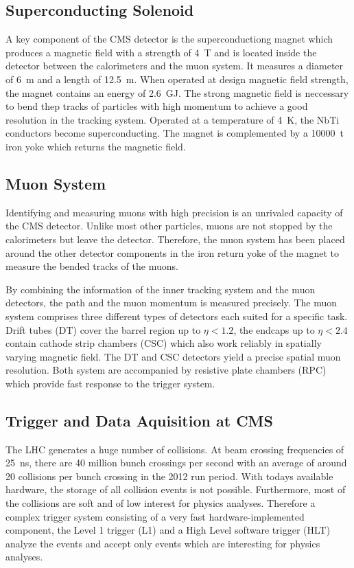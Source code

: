 \subsection{Superconducting Solenoid}

A key component of the CMS detector is the superconductiong magnet which
produces a magnetic field with a strength of \SI{4}{\tesla} and is located
inside the detector between the calorimeters and the muon system. It measures a
diameter of \SI{6}{\meter} and a length of \SI{12.5}{\meter}. When operated at
design magnetic field strength, the magnet contains an energy of
\SI{2.6}{\giga\joule}. The strong magnetic field is neccessary to bend thep
tracks of particles with high momentum to achieve a good resolution in the
tracking system. Operated at a temperature of \SI{4}{\kelvin}, the NbTi conductors become
superconducting. The magnet is complemented by a \SI{10000}{\tonne} iron yoke
which returns the magnetic field.

\subsection{Muon System}

Identifying and measuring muons with high precision is an unrivaled capacity of
the CMS detector. Unlike most other particles, muons are not stopped by the
calorimeters but leave the detector. Therefore, the muon system has been placed
around the other detector components in the iron return yoke of the magnet to
measure the bended tracks of the muons.

By combining the information of the inner tracking system and the muon
detectors, the path and the muon momentum is measured precisely. The muon
system comprises three different types of detectors each suited for a specific
task. Drift tubes (DT) cover the barrel region up to $\eta < 1.2$, the endcaps
up to $\eta < 2.4$ contain cathode strip chambers (CSC) which also
work reliably in spatially varying magnetic field. The DT and CSC detectors
yield a precise spatial muon resolution. Both system are accompanied by
resistive plate chambers (RPC) which provide fast response to the trigger
system.

\subsection{Trigger and Data Aquisition at CMS}

The LHC generates a huge number of collisions. At beam crossing frequencies of
\SI{25}{\nano \second}, there are 40 million bunch crossings per second with an
average of around 20 collisions per bunch crossing in the 2012 run period. With
todays available hardware, the storage of all collision events is not possible.
Furthermore, most of the collisions are soft and of low interest for physics
analyses. Therefore a complex trigger system consisting of a very fast
hardware-implemented component, the Level 1 trigger (L1) and a High Level
software trigger (HLT) analyze the events and accept only events which are
interesting for physics analyses.

